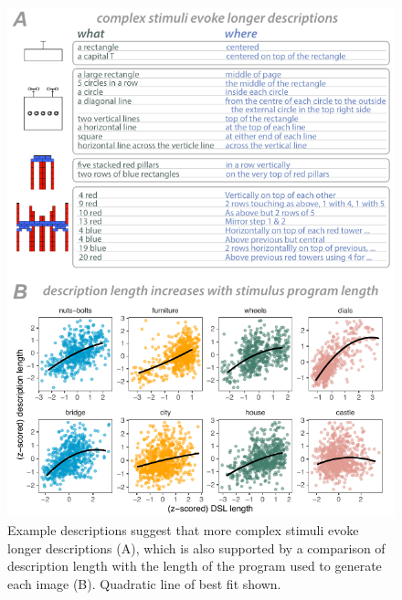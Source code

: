 \documentclass[10pt,letterpaper]{article}
\begin{document}
\begin{figure}
  \begin{center}
  \includegraphics[width=0.99\linewidth]{figures/lax_description_length.pdf}
  \caption{Example descriptions suggest that more complex stimuli evoke longer descriptions (A), which is also supported by a comparison of description length with the length of the program used to generate each image (B). Quadratic line of best fit shown. }
  \label{fig:words}
  \end{center}
\end{figure}


\end{document}

